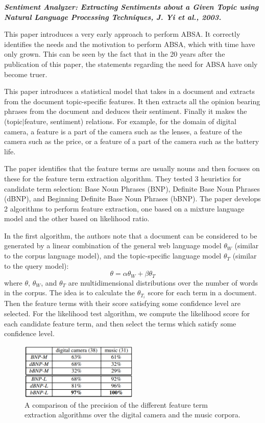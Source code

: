 \documentclass[conference]{IEEEtran}
\begin{document}
\textit{\textbf{Sentiment Analyzer: Extracting Sentiments about a Given Topic using Natural Language Processing Techniques, J. Yi et al., 2003.}}

This paper introduces a very early approach to perform ABSA. It correctly identifies the needs and the motivation to perform ABSA, which with time have only grown. This can be seen by the fact that in the 20 years after the publication of this paper, the statements regarding the need for ABSA have only become truer.

This paper introduces a statistical model that takes in a document and extracts from the document topic-specific features. It then extracts all the opinion bearing phrases from the document and deduces their sentiment. Finally it makes the (topic$\mid$feature, sentiment) relations. For example, for the domain of digital camera, a feature is a part of the camera such as the lenses, a feature of the camera such as the price, or a feature of a part of the camera such as the battery life.

The paper identifies that the feature terms are usually nouns and then focuses on these for the feature term extraction algorithm. They tested 3 heuristics for candidate term selection: Base Noun Phrases (BNP),  Definite Base Noun Phrases (dBNP), and Beginning Definite Base Noun Phrases (bBNP). The paper develops 2 algorithms to perform feature extraction, one based on a mixture language model and the other based on likelihood ratio.

In the first algorithm, the authors note that a document can be considered to be generated by a linear combination of the general web language model $\theta_W$ (similar to the corpus language model), and the  topic-specific language model $\theta_T$ (similar to the query model):
\begin{equation*}
  \theta = \alpha \theta_W + \beta \theta_T
\end{equation*}
where $\theta$, $\theta_W$, and $\theta_T$ are multidimensional distributions over the number of words in the corpus. The idea is to calculate the $\theta_{T_i}$ score for each term in a document. Then the feature terms with their score satisfying some confidence level are selected. For the likelihood test algorithm, we compute the likelihood score for each candidate feature term, and then select the terms which satisfy some confidence level.

\begin{figure}[htbp]
\centerline{\includegraphics[keepaspectratio, width=0.5\textwidth]{pics/13.png}}
\caption{A comparison of the precision of the different feature term extraction algorithms over the digital camera and the music corpora.}
\label{fig}
\end{figure}
\end{document}
